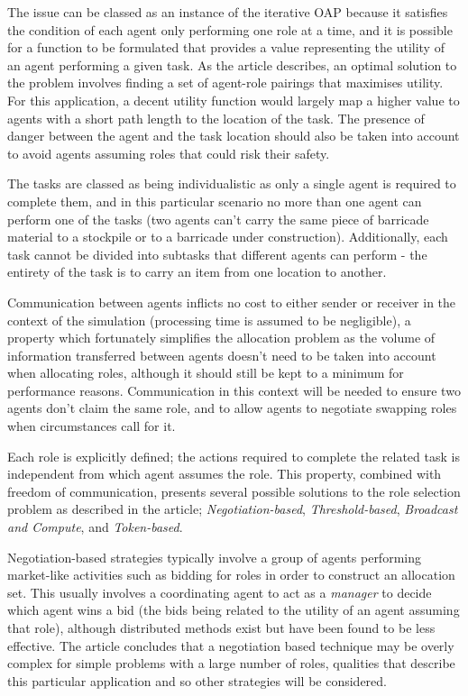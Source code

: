 \documentclass[12pt,a4paper]{article}
\begin{document}
The issue can be classed as an instance of the iterative OAP because it satisfies the condition of each agent only performing one role at a time, and it is possible for a function to be formulated that provides a value representing the utility of an agent performing a given task. As the article describes, an optimal solution to the problem involves finding a set of agent-role pairings that maximises utility. For this application, a decent utility function would largely map a higher value to agents with a short path length to the location of the task. The presence of danger between the agent and the task location should also be taken into account to avoid agents assuming roles that could risk their safety.

The tasks are classed as being individualistic as only a single agent is required to complete them, and in this particular scenario no more than one agent can perform one of the tasks (two agents can't carry the same piece of barricade material to a stockpile or to a barricade under construction). Additionally, each task cannot be divided into subtasks that different agents can perform - the entirety of the task is to carry an item from one location to another.

Communication between agents inflicts no cost to either sender or receiver in the context of the simulation (processing time is assumed to be negligible), a property which fortunately simplifies the allocation problem as the volume of information transferred between agents doesn't need to be taken into account when allocating roles, although it should still be kept to a minimum for performance reasons. Communication in this context will be needed to ensure two agents don't claim the same role, and to allow agents to negotiate swapping roles when circumstances call for it.

Each role is explicitly defined; the actions required to complete the related task is independent from which agent assumes the role. This property, combined with freedom of communication, presents several possible solutions to the role selection problem as described in the article; \emph{Negotiation-based}, \emph{Threshold-based}, \emph{Broadcast and Compute}, and \emph{Token-based}.

Negotiation-based strategies typically involve a group of agents performing market-like activities such as bidding for roles in order to construct an allocation set. This usually involves a coordinating agent to act as a \emph{manager} to decide which agent wins a bid (the bids being related to the utility of an agent assuming that role), although distributed methods exist but have been found to be less effective. The article concludes that a negotiation based technique may be overly complex for simple problems with a large number of roles, qualities that describe this particular application and so other strategies will be considered.
\end{document}
